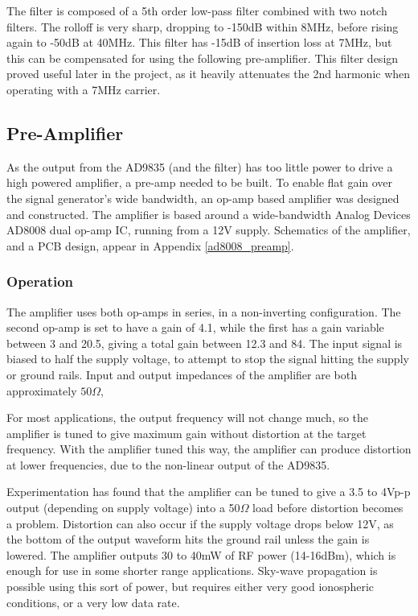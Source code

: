 \documentclass[a4paper,12pt]{article}
\begin{document}
The filter is composed of a 5th order low-pass filter combined with two notch filters. The rolloff is very sharp, dropping to -150dB within 8MHz, before rising again to -50dB at 40MHz. This filter has -15dB of insertion loss at 7MHz, but this can be compensated for using the following pre-amplifier. This filter design proved useful later in the project, as it heavily attenuates the 2nd harmonic when operating with a 7MHz carrier.

\subsection{Pre-Amplifier}

As the output from the AD9835 (and the filter) has too little power to drive a high powered amplifier, a pre-amp needed to be built. To enable flat gain over the signal generator's wide bandwidth, an op-amp based amplifier was designed and constructed. The amplifier is based around a wide-bandwidth Analog Devices AD8008 dual op-amp IC, running from a 12V supply. Schematics of the amplifier, and a PCB design, appear in Appendix \ref{ad8008_preamp}.

\subsubsection*{Operation}

The amplifier uses both op-amps in series, in a non-inverting configuration. The second op-amp is set to have a gain of 4.1, while the first has a gain variable between 3 and 20.5, giving a total gain between 12.3 and 84. The input signal is biased to half the supply voltage, to attempt to stop the signal hitting the supply or ground rails. Input and output impedances of the amplifier are both approximately $50\Omega$, 

For most applications, the output frequency will not change much, so the amplifier is tuned to give maximum gain without distortion at the target frequency. With the amplifier tuned this way, the amplifier can produce distortion at lower frequencies, due to the non-linear output of the AD9835. 

Experimentation has found that the amplifier can be tuned to give a 3.5 to 4Vp-p output (depending on supply voltage) into a 50$\Omega$ load before distortion becomes a problem. Distortion can also occur if the supply voltage drops below 12V, as the bottom of the output waveform hits the ground rail unless the gain is lowered. The amplifier outputs 30 to 40mW of RF power (14-16dBm), which is enough for use in some shorter range applications. Sky-wave propagation is possible using this sort of power, but requires either very good ionospheric conditions, or a very low data rate.
\end{document}
